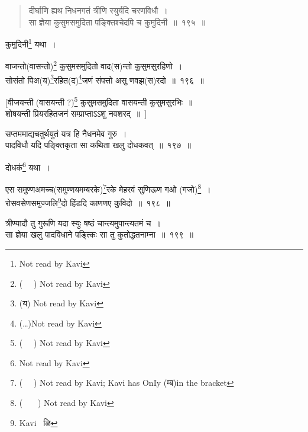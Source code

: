 \documentclass[11pt, openany]{book}
\begin{document}
\begin{quote}
{ }

{\na दीर्घाणि ह्यथ निधनगतं त्रीणि स्युर्यदि चरणविधौ~।\\
सा ज्ञेया कुसुमसमुदिता पङ्क्तिश्चेदपि च कुमुदिनी~॥~१९५~॥}
\end{quote}

\newpage

\begin{quote}

\end{quote}
कुमुदिनी\renewcommand{\thefootnote}{1}\footnote{Not read by Kavi} यथा~।\\

{\na वाजन्तो(वासन्तो)\renewcommand{\thefootnote}{2}\footnote{( \textendash\ \textendash\ \textendash ) Not read by Kavi} कुसुमसमुदितो वाद(स)न्तो कुसुमसुरहिणो~।\\
सोसंतो पिअ(य)\renewcommand{\thefootnote}{3}\footnote{(य) Not read by Kavi}रहित(द)\renewcommand{\thefootnote}{4}\footnote{(\ldots )Not read by Kavi}जणं संपत्तो असु णवझ(स)रदो~॥~१९६~॥

[वीजयन्ती (वासयन्ती ?)\renewcommand{\thefootnote}{5}\footnote{( \textendash\ \textendash\ \textendash ) Not read by Kavi} कुसुमसमुदिता वासयन्ती कुसुमसुरभिः~॥\\
शोषयन्ती प्रियरहितजनं सम्प्राप्ताऽऽशु नवशरद्~॥~]

सप्तममाद्यचतुर्थयुतं यत्र हि नैधनमेव गुरु~।\\
पादविधौ यदि पङ्क्तिकृता सा कथिता खलु दोधकवत्~॥~१९७~॥}

दोधकं\renewcommand{\thefootnote}{6}\footnote{Not read by Kavi} यथा~।

{\na एस समुण्णअमच्च(समुण्णयमम्बरके)\renewcommand{\thefootnote}{7}\footnote{( \textendash\ \textendash\ \textendash ) Not read by Kavi; Kavi has OnIy (म्ब)in the bracket}रके मेहरवं सुणिऊण गओ (गजो)\renewcommand{\thefootnote}{8}\footnote{( \textendash\ \textendash\ \textendash\ ) Not read by Kavi}~।\\
रोसवसेणसमुज्जलि\renewcommand{\thefootnote}{9}\footnote{Kavi \textendash\ ळि}दो हिंडदि काणणए कुविदो~॥~१९८~॥}

{ }

{\na त्रीण्यादौ तु गुरूणि यदा स्युः षष्ठं चान्त्यमुपान्त्यतमं च~।\\
सा ज्ञेया खलु पादविधाने पङ्त्किः सा तु कुतोद्धतनाम्ना~॥~१९९~॥}
\end{document}
